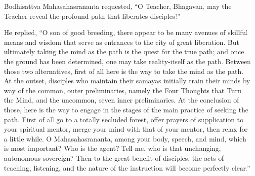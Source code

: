 \documentclass[a4paper,11pt,twoside,final]{book}
\begin{document}
Bodhisattva Mahasahasrananta requested, ``O Teacher, Bhagavan, may the
Teacher reveal the profound path that liberates disciples!'' 

He replied, ``O son of good breeding, there appear to be many avenues
of skillful means and wisdom that serve as entrances to the city of
great liberation. But ultimately taking the mind as the path is the
quest for the true path; and once the ground has been determined, one
may take reality-itself as the path. Between those two alternatives,
first of all here is the way to take the mind as the path.  At the
outset, disciples who maintain their samayas initially train their
minds by way of the common, outer preliminaries, namely the Four
Thoughts that Turn the Mind, and the uncommon, seven inner
preliminaries. At the conclusion of those, here is the way to engage
in the stages of the main practice of seeking the path.  First of all
go to a totally secluded forest, offer prayers of supplication to your
spiritual mentor, merge your mind with that of your mentor, then relax
for a little while. O Mahasahasrananta, among your body, speech, and
mind, which is most important? Who is the agent? Tell me, who is that
unchanging, autonomous sovereign? Then to the great benefit of
disciples, the acts of teaching, listening, and the nature of the
instruction will become perfectly clear.''
\end{document}
